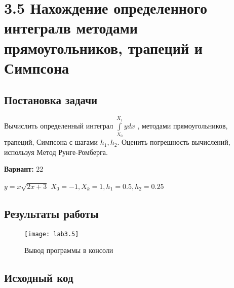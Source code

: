 \section* {3.5  Нахождение определенного интегралв методами прямоугольников, трапеций и Симпсона}

\subsection{Постановка задачи}
Вычислить определенный интеграл $\int\limits_{X_0}^{X_1} y dx$ , методами прямоугольников, трапеций, Симпсона с шагами $h_1,h_2$. Оценить погрешность вычислений, используя Метод Рунге-Ромберга.
 

{\bfseries Вариант:} 22

$y=x\sqrt{2x+3} $
$X_0=-1, X_k=1, h_1=0.5, h_2=0.25$

\subsection{Результаты работы}
\begin{figure}[h!]
\centering
\texttt{[image: lab3.5]}
\caption{Вывод программы в консоли}
\end{figure}


\pagebreak

\subsection{Исходный код}
% 




% 
% 
% 